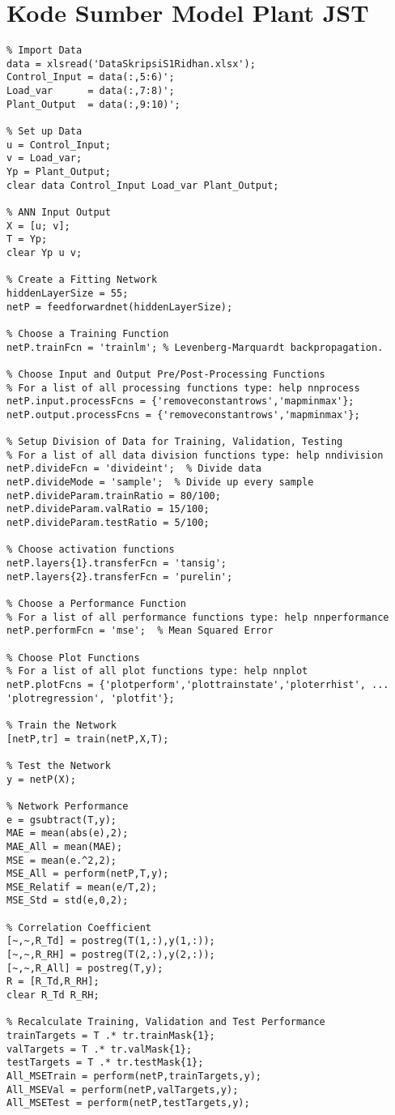 \section{Kode Sumber Model Plant JST}
\begin{lstlisting}
% Import Data
data = xlsread('DataSkripsiS1Ridhan.xlsx');
Control_Input = data(:,5:6)';
Load_var      = data(:,7:8)';
Plant_Output  = data(:,9:10)';

% Set up Data
u = Control_Input;
v = Load_var;
Yp = Plant_Output;
clear data Control_Input Load_var Plant_Output;

% ANN Input Output
X = [u; v];
T = Yp;
clear Yp u v;

% Create a Fitting Network
hiddenLayerSize = 55;
netP = feedforwardnet(hiddenLayerSize);

% Choose a Training Function
netP.trainFcn = 'trainlm'; % Levenberg-Marquardt backpropagation.

% Choose Input and Output Pre/Post-Processing Functions
% For a list of all processing functions type: help nnprocess
netP.input.processFcns = {'removeconstantrows','mapminmax'};
netP.output.processFcns = {'removeconstantrows','mapminmax'};

% Setup Division of Data for Training, Validation, Testing
% For a list of all data division functions type: help nndivision
netP.divideFcn = 'divideint';  % Divide data
netP.divideMode = 'sample';  % Divide up every sample
netP.divideParam.trainRatio = 80/100;
netP.divideParam.valRatio = 15/100;
netP.divideParam.testRatio = 5/100;

% Choose activation functions
netP.layers{1}.transferFcn = 'tansig';
netP.layers{2}.transferFcn = 'purelin';

% Choose a Performance Function
% For a list of all performance functions type: help nnperformance
netP.performFcn = 'mse';  % Mean Squared Error

% Choose Plot Functions
% For a list of all plot functions type: help nnplot
netP.plotFcns = {'plotperform','plottrainstate','ploterrhist', ...
'plotregression', 'plotfit'};

% Train the Network
[netP,tr] = train(netP,X,T);

% Test the Network
y = netP(X);

% Network Performance
e = gsubtract(T,y);
MAE = mean(abs(e),2);
MAE_All = mean(MAE);
MSE = mean(e.^2,2);
MSE_All = perform(netP,T,y);
MSE_Relatif = mean(e/T,2);
MSE_Std = std(e,0,2);

% Correlation Coefficient
[~,~,R_Td] = postreg(T(1,:),y(1,:));
[~,~,R_RH] = postreg(T(2,:),y(2,:));
[~,~,R_All] = postreg(T,y);
R = [R_Td,R_RH];
clear R_Td R_RH;

% Recalculate Training, Validation and Test Performance
trainTargets = T .* tr.trainMask{1};
valTargets = T .* tr.valMask{1};
testTargets = T .* tr.testMask{1};
All_MSETrain = perform(netP,trainTargets,y);
All_MSEVal = perform(netP,valTargets,y);
All_MSETest = perform(netP,testTargets,y);
\end{lstlisting}
\hfill

